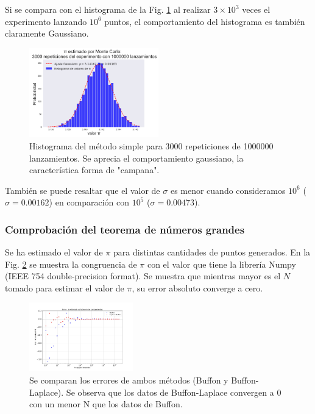 \documentclass{rbf}
\begin{document}
Si se compara con el histograma de la Fig. \ref{buff3} al realizar $3 \times 10^3$ veces el experimento lanzando $10^6$ puntos, el comportamiento del histograma es también claramente Gaussiano.

\begin{figure}[tbp!]
 \centering
  \includegraphics[width=0.5\textwidth]{figures/3000rep1e6.png}
	\caption{Histograma del método simple para 3000 repeticiones de 1000000 lanzamientos. Se aprecia el comportamiento gaussiano, la característica forma de "campana".}
 \label{buff3}
\end{figure}

También se puede resaltar que el valor de $\sigma$ es menor cuando consideramos $10^6$ ($\sigma=0.00162$) en comparación con $10^5$ ($\sigma=0.00473$). 

\subsubsection{Comprobación del teorema de números grandes}

Se ha estimado el valor de $\pi$ para distintas cantidades de puntos generados. En la Fig. \ref{buff11} se muestra la congruencia de $\pi$ con el valor que tiene la librería Numpy (IEEE 754 double-precision format). Se muestra que mientras mayor es el $N$ tomado para estimar el valor de $\pi$, su error absoluto converge a cero.

\begin{figure}[h]
 \centering
  \includegraphics[width=0.4\textwidth]{figures/err.jpg}
    \caption{Se comparan los errores de ambos métodos (Buffon y Buffon-Laplace). Se observa que los datos de Buffon-Laplace convergen a 0 con un menor N que los datos de Buffon.}
 \label{buff11}
\end{figure}
\end{document}

